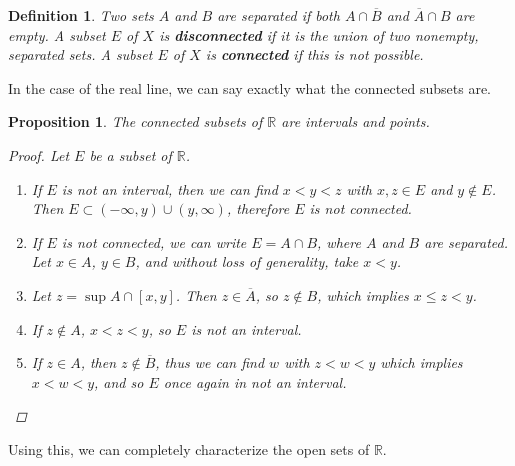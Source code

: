 \documentclass[10pt]{article}         %
\newtheorem{definition}{Definition}[section]
\newtheorem{proposition}{Proposition}[section]
\theoremstyle{remark}
\newcommand{\R}{\mathbb{R}}
\begin{document}
\begin{definition}
Two sets $A$ and $B$ are \emph{separated} if both $A \cap \overline{B}$ and $\overline{A}\cap B$ are empty. A subset $E$ of $X$ is \textbf{disconnected} if it is the union of two nonempty, separated sets. A subset $E$ of $X$ is \textbf{connected} if this is not possible.
\end{definition}

In the case of the real line, we can say exactly what the connected subsets are.

\begin{proposition}
The connected subsets of $\R$ are intervals and points.
\begin{proof}
Let $E$ be a subset of $\R$.
\begin{enumerate}
    \item If $E$ is not an interval, then we can find $x < y < z$ with $x, z \in E$ and $y \notin E$. Then $E \subset (-\infty, y)\cup(y,\infty)$, therefore $E$ is not connected.
    \item If $E$ is not connected, we can write $E = A \cap B$, where $A$ and $B$ are separated. Let $x \in A$, $y \in B$, and without loss of generality, take $x < y$. 
    \item Let $z = \sup A \cap [x, y]$. Then $z \in \overline{A}$, so $z \notin B$, which implies $x \leq z < y$.
    \item If $z \notin A$, $x < z < y$, so $E$ is not an interval.
    \item If $z \in A$, then $z \notin \overline{B}$, thus we can find $w$ with $z < w < y$ which implies $x < w < y$, and so $E$ once again in not an interval.
\end{enumerate}
\end{proof}
\end{proposition}

Using this, we can completely characterize the open sets of $\R$.
\end{document}
